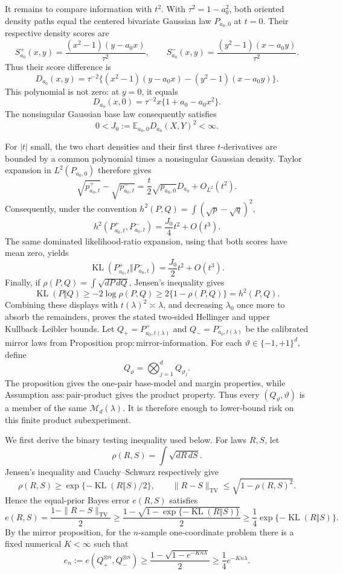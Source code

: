 It remains to compare information with \(t^2\).  With \(\tau^2=1-a_0^2\), both oriented density paths equal the centered bivariate Gaussian law \(P_{a_0,0}\) at \(t=0\).  Their respective density scores are
\[
S^+_{a_0}(x,y)=\frac{(x^2-1)(y-a_0x)}{\tau^2},\qquad
S^-_{a_0}(x,y)=\frac{(y^2-1)(x-a_0y)}{\tau^2}.
\]
Thus their score difference is
\[
D_{a_0}(x,y)=\tau^{-2}\{(x^2-1)(y-a_0x)-(y^2-1)(x-a_0y)\}.
\]
This polynomial is not zero: at \(y=0\), it equals
\[
D_{a_0}(x,0)=\tau^{-2}x\{1+a_0-a_0x^2\}.
\]
The nonsingular Gaussian base law consequently satisfies
\[
0<J_0:=\mathbb E_{a_0,0}D_{a_0}(X,Y)^2<\infty.
\]

For \(|t|\) small, the two chart densities and their first three \(t\)-derivatives are bounded by a common polynomial times a nonsingular Gaussian density.  Taylor expansion in \(L^2(P_{a_0,0})\) therefore gives
\[
\sqrt{p^+_{a_0,t}}-\sqrt{p^-_{a_0,t}}
=\frac t2\sqrt{p_{a_0,0}}D_{a_0}+O_{L^2}(t^2).
\]
Consequently, under the convention \(h^2(P,Q)=\int(\sqrt p-\sqrt q)^2\),
\[
h^2(P^+_{a_0,t},P^-_{a_0,t})=\frac{J_0}{4}t^2+O(t^3).
\]
The same dominated likelihood-ratio expansion, using that both scores have mean zero, yields
\[
\operatorname{KL}(P^+_{a_0,t}\Vert P^-_{a_0,t})=\frac{J_0}{2}t^2+O(t^3).
\]
Finally, if \(\rho(P,Q)=\int\sqrt{dP\,dQ}\), Jensen's inequality gives
\[
\operatorname{KL}(P\Vert Q)\ge-2\log\rho(P,Q)\ge2\{1-\rho(P,Q)\}=h^2(P,Q).
\]
Combining these displays with \(t(\lambda)^2\asymp\lambda\), and decreasing \(\lambda_0\) once more to absorb the remainders, proves the stated two-sided Hellinger and upper Kullback--Leibler bounds.
Let \(Q_+=P^+_{a_0,t(\lambda)}\) and \(Q_-=P^-_{a_0,t(\lambda)}\) be the calibrated mirror laws from Proposition \(\mathrm{prop:mirror\text{-}information}\).  For each \(\vartheta\in\{-1,+1\}^d\), define
\[
Q_\vartheta=\bigotimes_{j=1}^d Q_{\vartheta_j}.
\]
The proposition gives the one-pair base-model and margin properties, while Assumption \(\mathrm{ass:pair\text{-}product}\) gives the product property.  Thus every \((Q_\vartheta,\vartheta)\) is a member of the same \(\mathcal M_d(\lambda)\).  It is therefore enough to lower-bound risk on this finite product subexperiment.

We first derive the binary testing inequality used below.  For laws \(R,S\), let
\[
\rho(R,S)=\int\sqrt{dR\,dS}.
\]
Jensen's inequality and Cauchy--Schwarz respectively give
\[
\rho(R,S)\ge \exp\{-\operatorname{KL}(R\Vert S)/2\},\qquad
\|R-S\|_{\mathrm{TV}}\le\sqrt{1-\rho(R,S)^2}.
\]
Hence the equal-prior Bayes error \(e(R,S)\) satisfies
\[
e(R,S)=\frac{1-\|R-S\|_{\mathrm{TV}}}{2}
\ge\frac{1-\sqrt{1-\exp\{-\operatorname{KL}(R\Vert S)\}}}{2}
\ge\frac14\exp\{-\operatorname{KL}(R\Vert S)\}.
\]
By the mirror proposition, for the \(n\)-sample one-coordinate problem there is a fixed numerical \(K<\infty\) such that
\[
e_n:=e(Q_+^{\otimes n},Q_-^{\otimes n})\ge
\frac{1-\sqrt{1-e^{-Kn\lambda}}}{2}\ge\frac14e^{-Kn\lambda}.
\]

